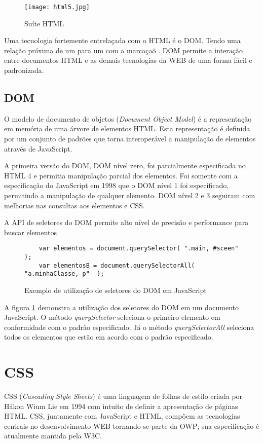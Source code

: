 \begin{figure}
    \centering
    \texttt{[image: html5.jpg]}
    \caption{Suíte HTML}
\end{figure}

Uma tecnologia fortemente entrelaçada com o HTML é o DOM. Tendo uma relação próxima de um para um com a marcaçaõ \autocite{howBrowsersWork}. DOM permite a interação entre documentos HTML e as demais tecnologias da WEB de uma forma fácil e padronizada.

\subsection{DOM}

O modelo de documento de objetos (\textit{Document Object Model}) é
a representação em memória de uma árvore de elementos HTML. Esta
representação é definida por um conjunto de padrões que torna
interoperável a manipulação de elementos através de JavaScript.

A primeira versão do DOM, DOM nível zero, foi parcialmente
especificada no HTML 4 e permitia manipulação parcial dos elementos.
Foi somente com a especificação do JavaScript em 1998 que o DOM nível
1 foi especificado, permitindo a manipulação de qualquer elemento. DOM
nível 2 e 3 seguiram com melhorias nas consultas aos elementos e CSS.

A API de seletores do DOM permite alto nível de precisão e performance
para buscar elementos

\begin{figure}
\centering
\begin{verbatim}
    var elementos = document.querySelector( ".main, #sceen"  );
    var elementosB = document.querySelectorAll( "a.minhaClasse, p"  );
\end{verbatim}
\caption{Exemplo de utilização de seletores do DOM em JavaScript}
\label{fig:selectorsSample}
\end{figure}

A figura \ref{fig:selectorsSample} demonstra a utilização dos seletores do DOM em um documento
JavaScript. O método \textit{querySelector} seleciona o primeiro elemento em conformidade
com o padrão especificado. Já o método \textit{querySelectorAll} seleciona todos os elementos
que estão em acordo com o padrão especificado.

\section{CSS}
CSS (\textit{Cascading Style Sheets}) é uma linguagem de folhas de
estilo criada por Håkon Wium Lie em 1994 com intuito de definir a
apresentação de páginas HTML. CSS, juntamente com JavaScript e HTML,
compõem as tecnologias centrais no desenvolvimento WEB tornando-se
parte da OWP; sua especificação é atualmente mantida pela W3C.

